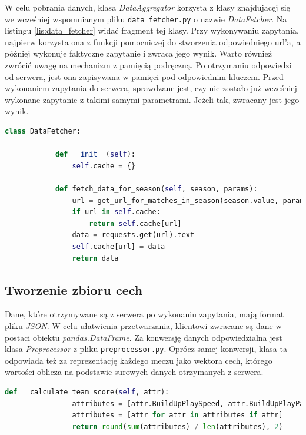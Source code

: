         W celu pobrania danych, klasa \emph{DataAggregator} korzysta z klasy znajdujacęj się we wcześniej wspomnianym pliku \texttt{data\_fetcher.py} o nazwie \emph{DataFetcher}. Na listingu \ref{lis:data_fetcher} widać fragment tej klasy. Przy wykonywaniu zapytania, najpierw korzysta ona z funkcji pomocniczej do stworzenia odpowiedniego url'a, a później wykonuje faktyczne zapytanie i zwraca jego wynik. Warto również zwrócić uwagę na mechanizm z pamięcią podręczną. Po otrzymaniu odpowiedzi od serwera, jest ona zapisywana w pamięci pod odpowiednim kluczem. Przed wykonaniem zapytania do serwera, sprawdzane jest, czy nie zostało już wcześniej wykonane zapytanie z takimi samymi parametrami. Jeżeli tak, zwracany jest jego wynik.
        
        
        \begin{lstlisting}[language=Python, label={lis:data_fetcher}, caption=Fragment klasy \emph{DataFetcher}]
        class DataFetcher:

            def __init__(self):
                self.cache = {}

            def fetch_data_for_season(self, season, params):
                url = get_url_for_matches_in_season(season.value, params)
                if url in self.cache:
                    return self.cache[url]
                data = requests.get(url).text
                self.cache[url] = data
                return data
        \end{lstlisting}
    
        
        
        \subsection{Tworzenie zbioru cech}
        \noindent Dane, które otrzymywane są z serwera po wykonaniu zapytania, mają format pliku \emph{JSON}. W celu ułatwienia przetwarzania, klientowi zwracane są dane w postaci obiektu \emph{pandas.DataFrame}. Za konwersję danych odpowiedzialna jest klasa \emph{Preprocessor} z pliku \texttt{preprocessor.py}. Oprócz samej konwersji, klasa ta odpowiada też za reprezentację każdego meczu jako wektora cech, którego wartości oblicza na podstawie surowych danych otrzymanych z serwera.
        
        \begin{lstlisting}[language=Python, label={lis:preprocessor}, caption=Obliczanie  wartości cechy \emph{home\_team\_score}]
            def __calculate_team_score(self, attr):
                attributes = [attr.BuildUpPlaySpeed, attr.BuildUpPlayPassing, attr.ChanceCreationPassing, attr.ChanceCreationCrossing, attr.ChanceCreationShooting, attr.DefencePressure, attr.DefenceAggression, attr.DefenceTeamWidth]
                attributes = [attr for attr in attributes if attr]
                return round(sum(attributes) / len(attributes), 2)
        \end{lstlisting}
        

